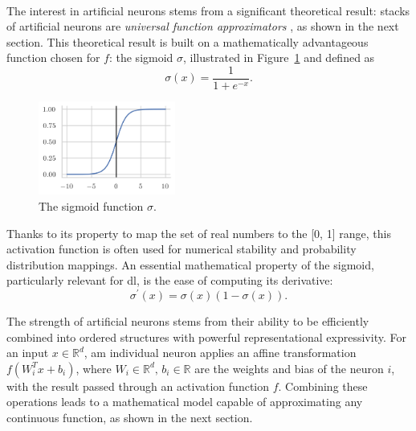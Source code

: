 \paragraph{} The interest in artificial neurons stems from a significant theoretical result: stacks of artificial neurons are \textit{universal function approximators} \cite{universalFuncApproxNN,HORNIK1989359}, as shown in the next section. This theoretical result is built on a mathematically advantageous function chosen for $f$: the sigmoid $\sigma$, illustrated in Figure~\ref{fig:sigmoid} and defined as
\begin{equation}\label{eq:sigmoid}
    \sigma(x) = \frac{1}{1 + e^{-x}}.
\end{equation}
\begin{figure}
    \begin{center}
        \includegraphics[width=0.4\textwidth]{Images/ML/sigmoid.png}
        \caption{The sigmoid function $\sigma$.} 
        \label{fig:sigmoid}
    \end{center}
\end{figure}

Thanks to its property to map the set of real numbers to the [0, 1] range, this activation function is often used for numerical stability and probability distribution mappings. An essential mathematical property of the sigmoid, particularly relevant for \gls{dl}, is the ease of computing its derivative: \[\sigma^\prime(x) = \sigma(x) (1- \sigma(x)).\]

The strength of artificial neurons stems from their ability to be efficiently combined into ordered structures with powerful representational expressivity. For an input $x \in \mathbb{R}^d$, am individual neuron applies an affine transformation $f(W_i^T x + b_i)$, where $W_i \in \mathbb{R}^d,\,b_i \in \mathbb{R}$ are the weights and bias of the neuron $i$, with the result passed through an activation function $f$. Combining these operations leads to a mathematical model capable of approximating any continuous function, as shown in the next section. 

